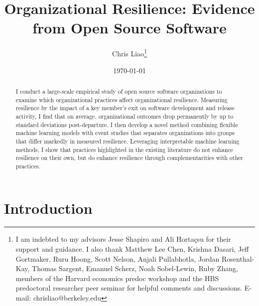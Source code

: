 \documentclass[12pt,notitlepage]{article}
\begin{document}
\begin{titlepage}
\title{Organizational Resilience: Evidence from Open Source Software}
\author{Chris Liao\thanks{I am indebted to my advisors Jesse Shapiro and Ali Hortaçsu for their support and guidance.
I also thank Matthew Lee Chen, Krishna Dasari, Jeff Gortmaker, Ruru Hoong, Scott Nelson, Anjali Pullabhotla, Jordan Rosenthal-Kay, Thomas Sargent, Emanuel Scherz, Noah Sobel-Lewin, Ruby Zhang, members of the Harvard economics predoc workshop and the HBS predoctoral researcher peer seminar for helpful comments and discussions.
E-mail: chrisliao@berkeley.edu}}
\date{\today}
\maketitle

\begin{abstract}
\noindent 
I conduct a large-scale empirical study of open source software organizations to examine which organizational practices affect organizational resilience.
Measuring resilience by the impact of a key member's exit on software development and release activity, I find that on average, organizational outcomes drop permanently by up to \AvgMaxDecline{} standard deviations post-departure.
I then develop a novel method combining flexible machine learning models with event studies that separates organizations into groups that differ markedly in measured resilience.
Leveraging interpretable machine learning methods, I show that practices highlighted in the existing literature do not enhance resilience on their own, but do enhance resilience through complementarities with other practices.

\end{abstract}

\setcounter{page}{0}
\thispagestyle{empty}
\end{titlepage}


\pagebreak \newpage

\section{Introduction} 
\label{sec:intro}

\end{document}
